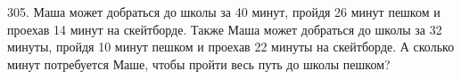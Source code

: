 305. Маша может добраться до школы за 40 минут, пройдя 26 минут пешком и проехав 14 минут на скейтборде. Также Маша может добраться до школы за 32 минуты, пройдя 10 минут пешком и проехав 22 минуты на скейтборде. А сколько минут потребуется Маше, чтобы пройти весь путь до школы пешком?\\
